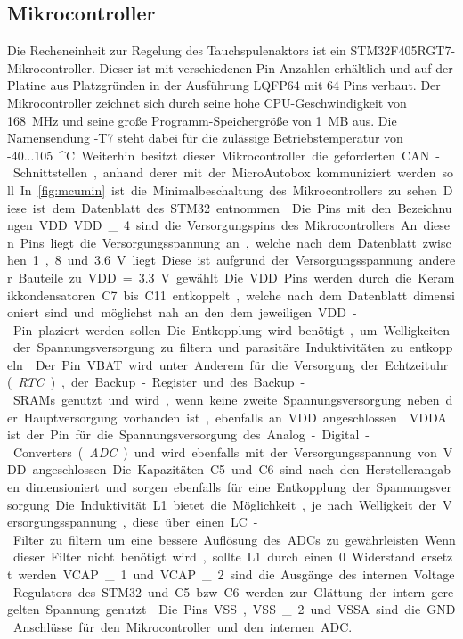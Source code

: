 \subsection{Mikrocontroller}
Die Recheneinheit zur Regelung des Tauchspulenaktors ist ein STM32F405RGT7-Mikrocontroller. Dieser ist mit verschiedenen Pin-Anzahlen erhältlich und auf der Platine aus Platzgründen in der Ausführung LQFP64 mit 64 Pins verbaut. Der Mikrocontroller zeichnet sich durch seine hohe CPU-Geschwindigkeit von \SI{168}{MHz} und seine große Programm-Speichergröße von \SI{1}{MB} aus. Die Namensendung -T7 steht dabei für die zulässige Betriebstemperatur von -40...\SI{105}{^\circ C}. Weiterhin besitzt dieser Mikrocontroller die geforderten CAN-Schnittstellen, anhand derer mit der MicroAutobox kommuniziert werden soll. In \autoref{fig:mcumin} ist die Minimalbeschaltung des Mikrocontrollers zu sehen. Diese ist dem Datenblatt des STM32 entnommen \cite[S.77]{stm32}. Die Pins mit den Bezeichnungen VDD...VDD\_4 sind die Versorgungspins des Mikrocontrollers. An diesen Pins liegt die Versorgungsspannung an, welche nach dem Datenblatt zwischen 1,8 und \SI{3,6}{V} liegt. Diese ist aufgrund der Versorgungsspannung anderer Bauteile zu VDD = \SI{3,3}{V} gewählt. Die VDD Pins werden durch die Keramikkondensatoren C7 bis C11 entkoppelt, welche nach dem Datenblatt dimensioniert sind und möglichst nah an den dem jeweiligen VDD-Pin plaziert werden sollen. Die Entkopplung wird benötigt, um Welligkeiten der Spannungsversorgung zu filtern und parasitäre Induktivitäten zu entkoppeln \cite{decoupling}. Der Pin VBAT wird unter Anderem für die Versorgung der Echtzeituhr (\textit{RTC}), der Backup-Register und des Backup-SRAMs genutzt und wird, wenn keine zweite Spannungsversorgung neben der Hauptversorgung vorhanden ist, ebenfalls an VDD angeschlossen \cite[S.31]{stm32}. VDDA ist der Pin für die Spannungsversorgung des Analog-Digital-Converters (\textit{ADC}) und wird ebenfalls mit der Versorgungsspannung von VDD angeschlossen. Die Kapazitäten C5 und C6 sind nach den Herstellerangaben dimensioniert und sorgen ebenfalls für eine Entkopplung der Spannungsversorgung. Die Induktivität L1 bietet die Möglichkeit, je nach Welligkeit der Versorgungsspannung, diese über einen LC-Filter zu filtern um eine bessere Auflösung des ADCs zu gewährleisten. Wenn dieser Filter nicht benötigt wird, sollte L1 durch einen \SI{0}{\Omega} Widerstand ersetzt werden.
VCAP\_1 und VCAP\_2 sind die Ausgänge des internen Voltage Regulators des STM32 und C5 bzw. C6 werden zur Glättung der intern geregelten Spannung genutzt \cite[S.77]{stm32}. Die Pins VSS, VSS\_2 und VSSA sind die GND Anschlüsse für den Mikrocontroller und den internen ADC.
